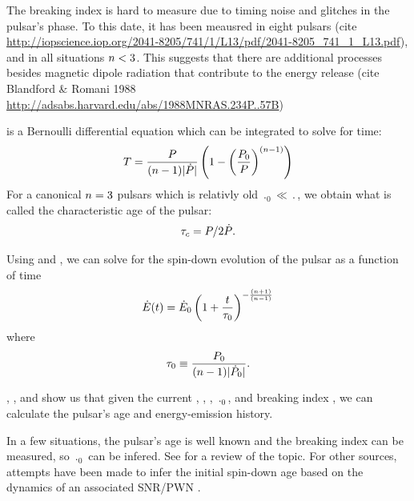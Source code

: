 The breaking index is hard to measure due to timing noise and glitches
in the pulsar's phase. To this date, it has been meausred in eight 
pulsars (cite \url{http://iopscience.iop.org/2041-8205/741/1/L13/pdf/2041-8205_741_1_L13.pdf}),
and in all situations $n<3$. This suggests 
that there are additional processes besides magnetic
dipole radiation that contribute to the energy release
(cite Blandford \& Romani 1988 \url{http://adsabs.harvard.edu/abs/1988MNRAS.234P..57B})

 is
a Bernoulli differential equation which can be integrated to solve for time:
\begin{equation}\eqnlabel{pulsar_age}
  T = \frac{\period}{(\breakingindex-1) \absval{\perioddot}}
  \left(
  1-\left(\frac{\period_0}{\period}\right)^{(\breakingindex-1)}
  \right)
\end{equation}
For a canonical $n=3$ pulsars which is
relativly old $\period_0 \ll \period$, we obtain
what is called the characteristic age of the pulsar:
\begin{equation}
  \tau_c = P/2\dot{P}.
\end{equation}

Using  and , we can solve
for the spin-down evolution of the pulsar
as a function of time
\citep{pacini_1973_evolution-supernova}
\begin{equation}\eqnlabel{energy_dot_vs_time}
    \energydot(t) = \energydot_0
    \left(
    1 + \frac{\time}{\SpinDownTimescale}
    \right)^{-\frac{(n+1)}{(n-1)}}
\end{equation}
where
\begin{equation}
  \tau_0 \equiv \frac{P_0}{(n-1)|\dot{P}_0|}.
\end{equation}


, ,
and  show us that given the current \period,
\perioddot, \energydot, $\period_0$, and breaking index \breakingindex,
we can calculate the pulsar's age and energy-emission history.

In a few situations, the pulsar's age is well known and the breaking index can be
measured, so $\period_0$ can be infered. See \cite{kaspi_2002_constraining-birth}
for a review of the topic. For other sources, attempts have been
made to infer the initial spin-down age based on the dynamics of an
associated \ac{SNR}/\ac{PWN} \citep{van-der-swaluw_2001_inferring-initial}.

